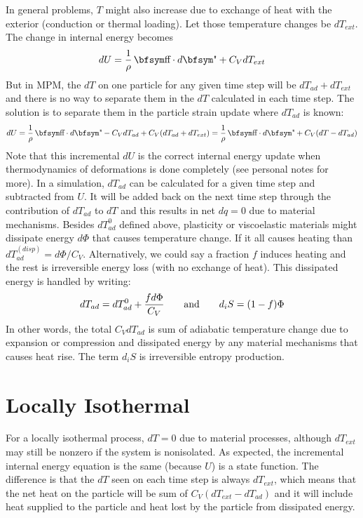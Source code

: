 \documentclass[11pt]{book}
\begin{document}
In general problems, $T$ might also increase due to exchange of heat with the exterior (conduction or thermal loading). Let those temperature changes be $dT_{ext}$. The change in internal energy becomes
\begin{equation}
    dU = {1\over \rho}\thinspace \st\cdot d\et + C_V dT_{ext}
\end{equation}
But in MPM, the $dT$ on one particle for any given time step will be $dT_{ad}+dT_{ext}$ and there is no way to separate them in the $dT$ calculated in each time step. The solution is to separate them in the particle strain update where $dT_{ad}$ is known:
\begin{equation}
    dU = {1\over \rho}\thinspace \st\cdot d\et - C_V dT_{ad} + C_V (dT_{ad}+dT_{ext}) = {1\over \rho}\thinspace \st\cdot d\et + C_V(dT-dT_{ad})
\end{equation}
Note that this incremental $dU$ is the correct internal energy update when thermodynamics of deformations is done completely (see personal notes for more).
In a simulation, $dT_{ad}$ can be calculated for a given time step and subtracted from $U$. It will be added back on the next time step through the contribution of $dT_{ad}$ to $dT$ and this results in net $dq=0$ due to material mechanisms. Besides $dT_{ad}^0$ defined above, plasticity or viscoelastic materials might dissipate energy $d\Phi$ that causes temperature change. If it all causes heating than $dT_{ad}^{(disp)} = d\Phi/C_V$. Alternatively, we could say a fraction $f$ induces heating and the rest is irreversible energy loss (with no exchange of heat). This dissipated energy is handled by writing:
\begin{equation}
    dT_{ad} = dT_{ad}^0 + {fd\Phi\over C_V}   \qquad {\rm and} \qquad d_iS = (1-f)\Phi
\end{equation}
In other words, the total $C_V dT_{ad}$ is sum of adiabatic temperature change due to expansion or compression and dissipated energy by any material mechanisms that causes heat rise. The term $d_iS$ is irreversible entropy production.

\section{Locally Isothermal}

For a locally isothermal process, $dT=0$ due to material processes, although $dT_{ext}$ may still be nonzero if the system is nonisolated. As expected, the incremental internal energy equation is the same (because $U$) is a state function. The difference is that the $dT$ seen on each time step is always $dT_{ext}$, which means that the net heat on the particle will be sum of $C_V(dT_{ext}-dT_{ad})$ and it will include heat supplied to the particle and heat lost by the particle from dissipated energy.
\end{document}
